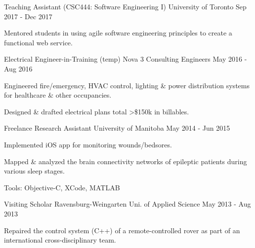 \begin{cventries}
  \cventry
    {Teaching Assistant (CSC444: Software Engineering I)} %
    {University of Toronto} %
    {\toronto} %
    {Sep 2017 - Dec 2017} %
    {
      \begin{cvitems} %
        \item {Mentored students in using agile software engineering principles to create a functional web service.}
      \end{cvitems}
    }

  \cventry
    {Electrical Engineer-in-Training (temp)} %
    {Nova 3 Consulting Engineers} %
    {\winnipeg} %
    {May 2016 - Aug 2016} %
    {
      \begin{cvitems} %
        \item {Engineered fire/emergency, HVAC control, lighting \& power distribution systems for healthcare \& other occupancies.}
        \item {Designed \& drafted electrical plans total >\$150k in billables.}
      \end{cvitems}
    }

  \cventry
	{Freelance Research Assistant} %
	{University of Manitoba} %
	{\winnipeg} %
	{May 2014 - Jun 2015} %
	{
		\begin{cvitems} %
			\item {Implemented iOS app for monitoring wounds/bedsores. \cite{Baril2015}}
			\item {Mapped \& analyzed the brain connectivity networks of epileptic patients during various sleep stages. \cite{Baghbani2015}}
			\item {Tools: Objective-C, XCode, MATLAB}
		\end{cvitems}
	}

  \cventry
	{Visiting Scholar} %
	{Ravensburg-Weingarten Uni. of Applied Science} %
	{\weingarten} %
	{May 2013 - Aug 2013} %
	{
		\begin{cvitems} %
			\item {Repaired the control system (C++) of a remote-controlled rover as part of an international cross-disciplinary team.}
		\end{cvitems}
	}


\end{cventries}

